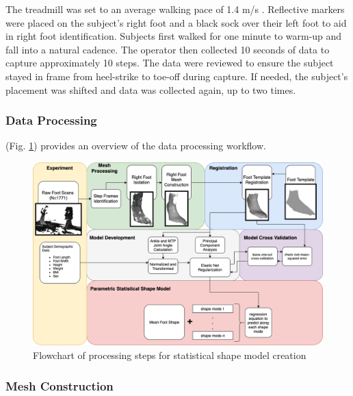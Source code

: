 \documentclass[defaultstyle,11pt]{comps}
\begin{document}
The treadmill was set to an average walking pace of 1.4 m/s \citep{Browning2006}.
Reflective markers were placed on the subject's right foot and a black sock over their left foot to aid in right foot identification.
Subjects first walked for one minute to warm-up and fall into a natural cadence.
The operator then collected 10 seconds of data to capture approximately 10 steps.
The data were reviewed to ensure the subject stayed in frame from heel-strike to toe-off during capture. If needed, the subject's placement was shifted and data was collected again, up to two times.

\hypertarget{data-processing}{%
\subsubsection{Data Processing}\label{data-processing}}

(Fig. \ref{fig:dataflow}) provides an overview of the data processing workflow.

\begin{figure}
\hypertarget{fig:dataflow}{%
\centering
\includegraphics{../fig/SA2/footProcessing.png}
\caption{Flowchart of processing steps for statistical shape model creation}\label{fig:dataflow}
}
\end{figure}

\hypertarget{mesh-construction}{%
\subsubsection{Mesh Construction}\label{mesh-construction}}
\end{document}
